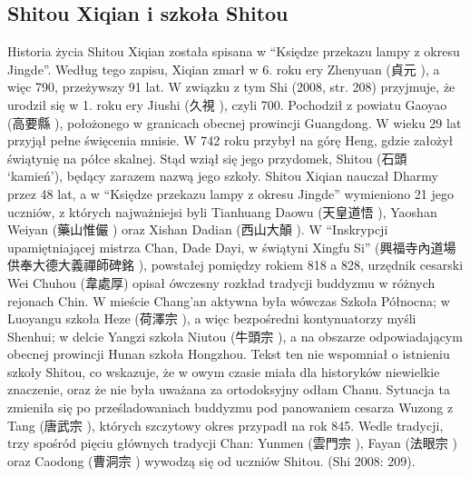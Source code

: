 \subsection{Shitou Xiqian i szkoła Shitou}
Historia życia Shitou Xiqian została spisana w ``Księdze przekazu lampy z okresu Jingde''.
Według tego zapisu, Xiqian zmarł w 6. roku ery Zhenyuan (貞元 ), a więc 790, przeżywszy 91 lat.
W związku z tym Shi (2008, str. 208) przyjmuje, że urodził się w 1. roku ery Jiushi (久視 ), czyli 700.
Pochodził z powiatu Gaoyao (高要縣 ), położonego w granicach obecnej prowincji Guangdong.
W wieku 29 lat przyjął pełne święcenia mnisie.
W 742 roku przybył na górę Heng, gdzie założył świątynię na półce skalnej.
Stąd wziął się jego przydomek, Shitou (石頭  `kamień'), będący zarazem nazwą jego szkoły.
Shitou Xiqian nauczał Dharmy przez 48 lat, a w ``Księdze przekazu lampy z okresu Jingde'' wymieniono 21 jego uczniów, z których najważniejsi byli Tianhuang Daowu (天皇道悟 ), Yaoshan Weiyan (藥山惟儼 ) oraz Xishan Dadian (西山大顛 ).
W ``Inskrypcji upamiętniającej mistrza Chan, Dade Dayi, w świątyni Xingfu Si'' (興福寺內道場供奉大德大義禪師碑銘 ), powstałej pomiędzy rokiem 818 a 828, urzędnik cesarski Wei Chuhou (韋處厚) opisał ówczesny rozkład tradycji buddyzmu w różnych rejonach Chin.
W mieście Chang'an aktywna była wówczas Szkoła Północna; w Luoyangu szkoła Heze (荷澤宗 ), a więc bezpośredni kontynuatorzy myśli Shenhui; w delcie Yangzi szkoła Niutou (牛頭宗 ), a na obszarze odpowiadającym obecnej prowincji Hunan szkoła Hongzhou.
Tekst ten nie wspomniał o istnieniu szkoły Shitou, co wskazuje, że w owym czasie miała dla historyków niewielkie znaczenie, oraz że nie była uważana za ortodoksyjny odłam Chanu.
Sytuacja ta zmieniła się po prześladowaniach buddyzmu pod panowaniem cesarza Wuzong z Tang (唐武宗 ), których szczytowy okres przypadł na rok 845.
Wedle tradycji, trzy spośród pięciu głównych tradycji Chan: Yunmen (雲門宗 ), Fayan (法眼宗 ) oraz Caodong (曹洞宗 ) wywodzą się od uczniów Shitou.
(Shi 2008: 209).

